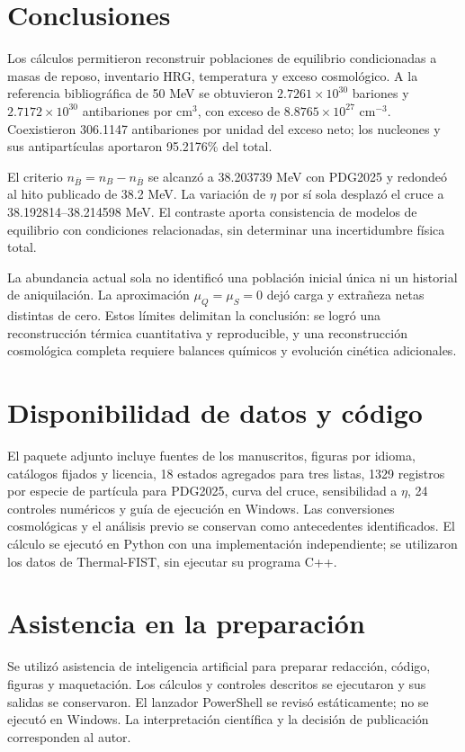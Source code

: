 \section{Conclusiones}
Los cálculos permitieron reconstruir poblaciones de equilibrio condicionadas a masas de reposo, inventario HRG, temperatura y exceso cosmológico. A la referencia bibliográfica de 50 MeV se obtuvieron $2.7261\times10^{30}$ bariones y $2.7172\times10^{30}$ antibariones por cm$^3$, con exceso de $8.8765\times10^{27}$ cm$^{-3}$. Coexistieron 306.1147 antibariones por unidad del exceso neto; los nucleones y sus antipartículas aportaron 95.2176\% del total.

El criterio $n_{\bar B}=n_B-n_{\bar B}$ se alcanzó a 38.203739 MeV con PDG2025 y redondeó al hito publicado de 38.2 MeV. La variación de $\eta$ por sí sola desplazó el cruce a 38.192814--38.214598 MeV. El contraste aporta consistencia de modelos de equilibrio con condiciones relacionadas, sin determinar una incertidumbre física total.

La abundancia actual sola no identificó una población inicial única ni un historial de aniquilación. La aproximación $\mu_Q=\mu_S=0$ dejó carga y extrañeza netas distintas de cero. Estos límites delimitan la conclusión: se logró una reconstrucción térmica cuantitativa y reproducible, y una reconstrucción cosmológica completa requiere balances químicos y evolución cinética adicionales.

\section*{Disponibilidad de datos y código}
El paquete adjunto incluye fuentes de los manuscritos, figuras por idioma, catálogos fijados y licencia, 18 estados agregados para tres listas, 1329 registros por especie de partícula para PDG2025, curva del cruce, sensibilidad a $\eta$, 24 controles numéricos y guía de ejecución en Windows. Las conversiones cosmológicas y el análisis previo se conservan como antecedentes identificados. El cálculo se ejecutó en Python con una implementación independiente; se utilizaron los datos de Thermal-FIST, sin ejecutar su programa C++.

\section*{Asistencia en la preparación}
Se utilizó asistencia de inteligencia artificial para preparar redacción, código, figuras y maquetación. Los cálculos y controles descritos se ejecutaron y sus salidas se conservaron. El lanzador PowerShell se revisó estáticamente; no se ejecutó en Windows. La interpretación científica y la decisión de publicación corresponden al autor.
